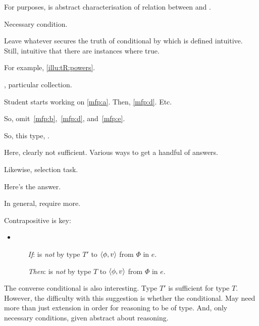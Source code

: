\begin{note}
  For purposes, \rotoc{} is abstract characterisation of relation between \tC{} and \ptC{}.

  Necessary condition.

  Leave whatever secures the truth of conditional by which \rotoc{} is defined intuitive.
  Still, intuitive that there are instances where true.

  For example, \autoref{illu:tR:powers}.

  \tocN{}, particular collection.

  Student starts working on \ref{mfp:a}.
  Then, \ref{mfp:d}.
  Etc.

  So, omit~\ref{mfp:b},~\ref{mfp:d}, and~\ref{mfp:e}.

  So, this type, \rotoc{}.

  Here, clearly not sufficient.
  Various ways to get a handful of answers.


  Likewise, selection task.

  Here's the answer.

  In general, require more.
\end{note}

\begin{note}
  Contrapositive is key:

  \begin{itemize}
  \item
    \begin{itemize}
    \item[\emph{If}:]
      \vAgent{} is \emph{not} \ptCV{} by type \(T'\) to \(\langle \phi, v \rangle\) from \(\Phi\) in \(e\).
    \item[\emph{Then}:]
      \vAgent{} is \emph{not} \tCV{} by type \(T\) to \(\langle \phi, v \rangle\) from \(\Phi\) in \(e\).
    \end{itemize}
  \end{itemize}
\end{note}

\begin{note}
  The converse conditional is also interesting.
  Type \(T'\) is sufficient for type \(T\).
  However, the difficulty with this suggestion is whether the conditional.
  May need more than just extension in order for reasoning to be of type.
  And, only necessary conditions, given abstract about reasoning.
\end{note}

\subsection{}
\label{cha:typical:sec:tR:tRDef}

